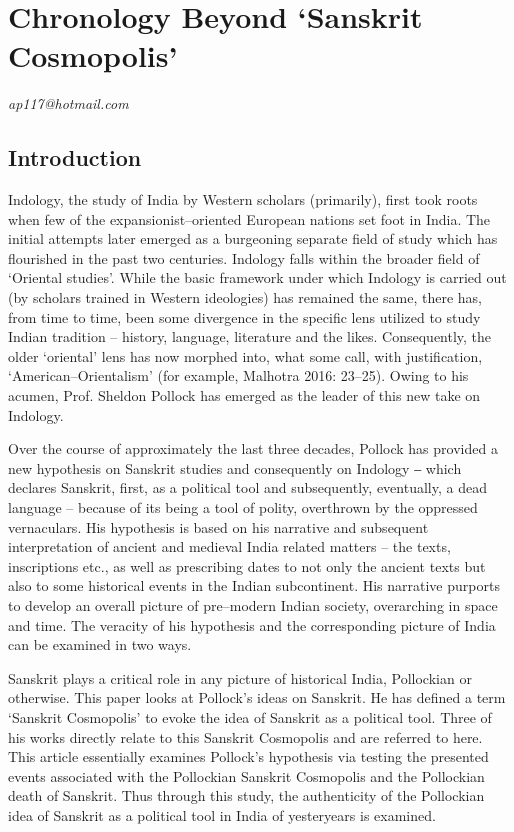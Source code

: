 
\chapter{Chronology Beyond ‘Sanskrit Cosmopolis’}\label{chapter7}


\begin{flushright}
\textit{ap117@hotmail.com}
\end{flushright}


\section*{Introduction}

Indology, the study of India by Western scholars (primarily), first took roots when few of the expansionist–oriented European nations set foot in India. The initial attempts later emerged as a burgeoning separate field of study which has flourished in the past two centuries. Indology falls within the broader field of ‘Oriental studies’. While the basic framework under which Indology is carried out (by scholars trained in Western ideologies) has remained the same, there has, from time to time, been some divergence in the specific lens utilized to study Indian tradition – history, language, literature and the likes. Consequently, the older ‘oriental’ lens has now morphed into, what some call, with justification, ‘American–Orientalism’ (for example, Malhotra 2016: 23–25). Owing to his acumen, Prof. Sheldon Pollock has emerged as the leader of this new take on Indology.

Over the course of approximately the last three decades, Pollock has provided a new hypothesis on Sanskrit studies and consequently on Indology ‒ which declares Sanskrit, first, as a political tool and subsequently, eventually, a dead language – because of its being a tool of polity, overthrown by the oppressed vernaculars. His hypothesis is based on his narrative and subsequent interpretation of ancient and medieval India related matters – the texts, inscriptions etc., as well as prescribing dates to not only the ancient texts but also to some historical events in the Indian subcontinent. His narrative purports to develop an overall picture of pre–modern Indian society, overarching in space and time. The veracity of his hypothesis and the corresponding picture of India can be examined in two ways.

Sanskrit plays a critical role in any picture of historical India, Pollockian or otherwise. This paper looks at Pollock’s ideas on Sanskrit. He has defined a term ‘Sanskrit Cosmopolis’ to evoke the idea of Sanskrit as a political tool. Three of his works directly relate to this Sanskrit Cosmopolis and are referred to here. This article essentially examines Pollock’s hypothesis via testing the presented events associated with the Pollockian Sanskrit Cosmopolis and the Pollockian death of Sanskrit. Thus through this study, the authenticity of the Pollockian idea of Sanskrit as a political tool in India of yesteryears is examined.

